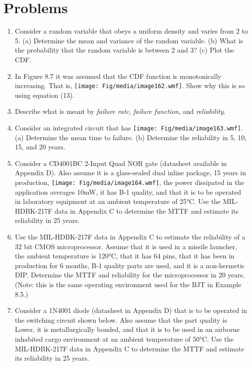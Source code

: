 \section{Problems}
\label{section:problems}

\begin{enumerate}
\def\labelenumi{\arabic{enumi}.}
\item
  Consider a random variable that obeys a uniform density and varies
  from 2 to 5. (a) Determine the mean and variance of the random
  variable. (b) What is the probability that the random variable is
  between 2 and 3? (c) Plot the CDF.
\item
  In Figure 8.7 it was assumed that the CDF function is monotonically
  increasing. That is, \texttt{[image: Fig/media/image162.wmf]}. Show
  why this is so using equation (13).
\item
  Describe what is meant by \emph{failure rate}, \emph{failure
  function}, and \emph{reliability}.
\item
  Consider an integrated circuit that has
  \texttt{[image: Fig/media/image163.wmf]}. (a) Determine the mean time
  to failure. (b) Determine the reliability in 5, 10, 15, and 20 years.
\item
  Consider a CD4001BC 2-Input Quad NOR gate (datasheet available in
  Appendix D). Also assume it is a glass-sealed dual inline package, 15
  years in production, \texttt{[image: Fig/media/image164.wmf]}, the
  power dissipated in the application averages 10mW, it has B-1 quality,
  and that it is to be operated in laboratory equipment at an ambient
  temperature of 25°C. Use the MIL-HDBK-217F data in Appendix C to
  determine the MTTF and estimate its reliability in 25 years.
\item
  Use the MIL-HDBK-217F data in Appendix C to estimate the reliability
  of a 32 bit CMOS microprocessor. Assume that it is used in a missile
  launcher, the ambient temperature is 120°C, that it has 64 pins, that
  it has been in production for 6 months, B-1 quality parts are used,
  and it is a non-hermetic DIP. Determine the MTTF and reliability for
  the microprocessor in 20 years. (Note: this is the same operating
  environment used for the BJT in Example 8.5.)
\item
  Consider a 1N4001 diode (datasheet in Appendix D) that is to be
  operated in the switching circuit shown below. Also assume that the
  part quality is Lower, it is metallurgically bonded, and that it is to
  be used in an airborne inhabited cargo environment at an ambient
  temperature of 50°C. Use the MIL-HDBK-217F data in Appendix C to
  determine the MTTF and estimate its reliability in 25 years.
\end{enumerate}

